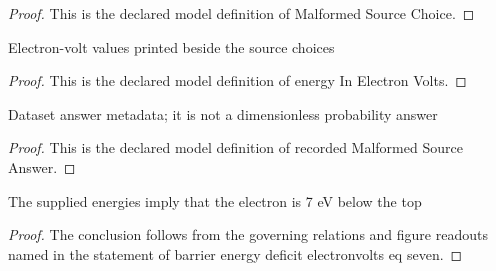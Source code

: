 \begin{proof}
  This is the declared model definition of Malformed Source Choice.
\end{proof}
\begin{definition}
  \label{def:physics:phyx-mini-0616:phyxminiproblems-problemphyxmini0616-malformedsourcechoice-energyinelectronvolts}
  Electron-volt values printed beside the source choices
\end{definition}
\begin{proof}
  This is the declared model definition of energy In Electron Volts.
\end{proof}
\begin{definition}
  \label{def:physics:phyx-mini-0616:phyxminiproblems-problemphyxmini0616-recordedmalformedsourceanswer}
  Dataset answer metadata; it is not a dimensionless probability answer
\end{definition}
\begin{proof}
  This is the declared model definition of recorded Malformed Source Answer.
\end{proof}
\begin{lemma}
  \label{lem:physics:phyx-mini-0616:phyxminiproblems-problemphyxmini0616-barrier-energy-deficit-electronvolts-eq-seven}
  The supplied energies imply that the electron is 7 eV below the top
\end{lemma}
\begin{proof}
  The conclusion follows from the governing relations and figure readouts named in the statement of barrier energy deficit electronvolts eq seven.
\end{proof}
